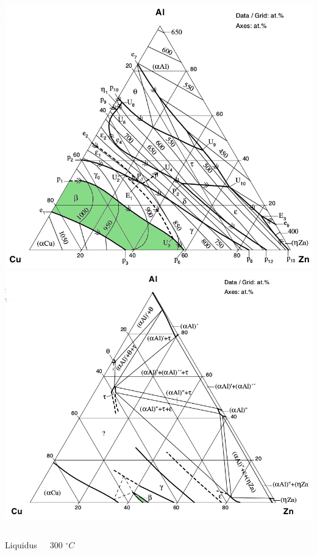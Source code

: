 \documentclass[usenames,dvipsnames]{beamer}
\begin{document}
\begin{frame}
\begin{columns}
\includegraphics[width=\columnwidth]{img/intro/IsotermaLiq.png}
\includegraphics[width=\columnwidth]{img/intro/Isoterma300.png}

\end{columns}

\begin{center}
\begin{columns}
  
 Liquidus
 
 $300$ $^\circ C$
 \end{columns}
\end{center}

\end{frame}
\end{document}
